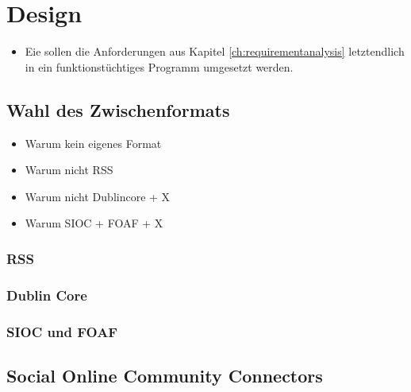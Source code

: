 
\chapter{Design}
\label{ch:design}

\begin{itemize}
    \item Eie sollen die Anforderungen aus Kapitel \ref{ch:requirementanalysis} letztendlich in ein funktionstüchtiges Programm umgesetzt werden. 
\end{itemize}


\section{Wahl des Zwischenformats} %
\label{sec:selection_of_the_itermediate_format}
\begin{itemize}
    \item Warum kein eigenes Format
    \item Warum nicht RSS 
    \item Warum nicht Dublincore + X
    \item Warum SIOC + FOAF + X
\end{itemize}

\subsection{RSS} %
\label{sub:rss}

\subsection{Dublin Core} %
\label{sub:dublin_core}

\subsection{SIOC und FOAF} %
\label{sub:sioc_und_foaf}



\section{Social Online Community Connectors} %
\label{sec:connectors}

